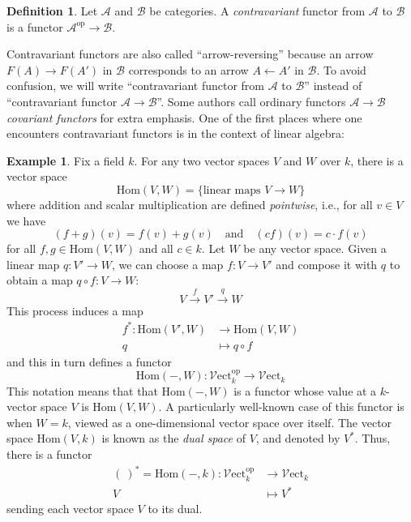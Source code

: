 \documentclass[10pt,oneside]{book}
\def\~#1{\mathscr{#1}}
\def\To#1{\xrightarrow{#1}}
\newcommand{\op}{\mathrm{op}}
\newcommand{\Hom}{\mathrm{Hom}}
\newcommand{\Vect}{\~V\mathrm{ect}}
\theoremstyle{plain}
\theoremstyle{definition}
\newtheorem{defn}[thm]{Definition}
\newtheorem{ex}[thm]{Example}
\theoremstyle{remark}
\numberwithin{equation}{section}
\numberwithin{figure}{section}
\begin{document}
\begin{defn}
    Let $\~A$ and $\~B$ be categories. A \emph{contravariant} functor from $\~A$ to $\~B$ is a functor $\~A^\op \to \~B$. 
\end{defn}

Contravariant functors are also called ``arrow-reversing'' because an arrow $F(A) \to F(A')$ in $\~B$ corresponds to an arrow $A \leftarrow A'$ in $\~B$. To avoid confusion, we will write ``contravariant functor from $\~A$ to $\~B$'' instead of ``contravariant functor $\~A \to \~B$''. Some authors call ordinary functors $\~A \to \~B$ \emph{covariant functors} for extra emphasis. One of the first places where one encounters contravariant functors is in the context of linear algebra:

\begin{ex}
\label{ex:double_dual}
    Fix a field $k$. For any two vector spaces $V$ and $W$ over $k$, there is a vector space
\[\Hom(V, W) = \{\text{linear maps } V \to W\}\]
where addition and scalar multiplication are defined \emph{pointwise}, i.e., for all $v \in V$ we have
\[(f + g)(v) = f(v) + g(v) \quad \text{and} \quad (cf)(v) = c\cdot f(v)\]
for all $f, g \in \Hom(V, W)$ and all $c \in k$. Let $W$ be any vector space. Given a linear map $q: V' \to W$, we can choose a map $f: V \to V'$ and compose it with $q$ to obtain a map $q \circ f: V \to W$:
\[V \To{f} V' \To{q} W\] 
This process induces a map
\begin{align*}
f^\ast : \Hom(V', W) &\to \Hom(V, W)\\
                   q &\mapsto q \circ f 
\end{align*}
and this in turn defines a functor
\[\Hom(-, W): \Vect_k^\op \to \Vect_k\]
This notation means that that $\Hom(-, W)$ is a functor whose value at a $k$-vector space $V$ is $\Hom(V, W)$. A particularly well-known case of this functor is when $W = k$, viewed as a one-dimensional vector space over itself. The vector space $\Hom(V, k)$ is known as the \emph{dual space} of $V$, and denoted by $V^\ast$. Thus, there is a functor
\begin{align*}
(~)^\ast = \Hom(-, k): \Vect_k^\op &\to \Vect_k \\
                        V &\mapsto V^\ast
\end{align*}
sending each vector space $V$ to its dual.
\end{ex} 
\end{document}

